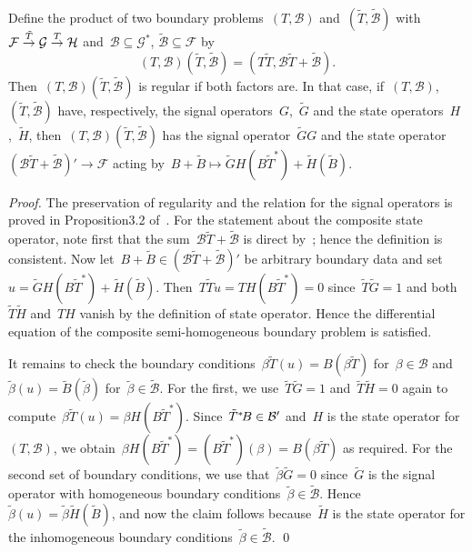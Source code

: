 \documentclass[a4paper]{llncs}
\newcommand{\galg}{\mathcal{F}}
\newcommand{\ogalg}{\mathcal{G}}
\newcommand{\oogalg}{\mathcal{H}}
\newcommand{\bspc}{\mathcal{B}}
\newenvironment{myproof}{\begin{proof}}{\qed\end{proof}}
\begin{document}
\begin{myproposition}
  \label{prop:bp-product}
  Define the product of two boundary problems~$(T, \bspc)$ and~$(\tilde{T},
  \tilde{\bspc})$ with~$\vphantom{\overset{e}{\to}}\smash{\galg
    \overset{\tilde{T}}{\to} \ogalg \overset{T}{\to} \oogalg}$ and~$\bspc
  \subseteq \ogalg^*$, $\tilde{\bspc} \subseteq \galg$ by
\begin{equation*}
    (T, \bspc) (\tilde{T}, \tilde{\bspc}) = (T \tilde{T}, \bspc \tilde{T} +
    \tilde{\bspc}).
  \end{equation*}
Then~$(T, \bspc) (\tilde{T}, \tilde{\bspc})$ is regular if both factors
  are. In that case, if~$(T, \bspc)$,~$(\tilde{T}, \tilde{\bspc})$ have,
  respectively, the signal operators~$G$,~$\tilde{G}$ and the state
  operators~$H$,~$\tilde{H}$, then~$(T, \bspc) (\tilde{T}, \tilde{\bspc})$ has
  the signal operator~$\tilde{G} G$ and the state operator~$(\bspc \tilde{T} +
  \tilde{\bspc})' \to \galg$ acting by~$B + \tilde{B} \mapsto \tilde{G}H(B
  \tilde{T}^*) + \tilde{H}(\tilde{B})$.
\end{myproposition}
\begin{myproof}
  The preservation of regularity and the relation for the signal operators is
  proved in Proposition3.2 of~\cite{RegensburgerRosenkranz2009}. For the statement
  about the composite state operator, note first that the sum~$\bspc \tilde{T} +
  \tilde{\bspc}$ is direct by~\cite[(3.2)]{RegensburgerRosenkranz2009}; hence
  the definition is consistent. Now let~$B + \tilde{B} \in (\bspc \tilde{T} +
  \tilde{\bspc})'$ be arbitrary boundary data and set~$u = \tilde{G}H(B
  \tilde{T}^*) + \tilde{H}(\tilde{B})$. Then~$T \tilde{T} u = TH(B \tilde{T}^*)
  = 0$ since~$\tilde{T}\tilde{G} = 1$ and both~$\tilde{T} \tilde{H}$ and~$TH$
  vanish by the definition of state operator. Hence the differential equation of
  the composite semi-homogeneous boundary problem is satisfied.

  It remains to check the boundary conditions~$\beta \tilde{T}(u) = B(\beta
  \tilde{T})$ for~$\beta \in \bspc$ and~$\tilde{\beta}(u) =
  \tilde{B}(\tilde{\beta})$ for~$\tilde{\beta} \in \tilde{\bspc}$. For the
  first, we use~$\tilde{T} \tilde{G} = 1$ and~$\tilde{T} \tilde{H} = 0$ again to
  compute~$\beta \tilde{T}(u) = \beta H (B \tilde{T}^*)$. Since~$\tilde{T}^*
  \kern-1.5pt B \in \bspc'$ and~$H$ is the state operator for~$(T, \bspc)$, we
  obtain~$\beta H(B \tilde{T}^*) = (B \tilde{T}^*) (\beta) = B(\beta \tilde{T})$
  as required. For the second set of boundary conditions, we use
  that~$\tilde{\beta} \tilde{G} = 0$ since~$\tilde{G}$ is the signal operator
  with homogeneous boundary conditions~$\tilde{\beta} \in
  \tilde{\bspc}$. Hence~$\tilde{\beta}(u) = \tilde{\beta} \tilde{H}(\tilde{B})$,
  and now the claim follows because~$\tilde{H}$ is the state operator for the
  inhomogeneous boundary conditions~$\tilde{\beta} \in \tilde{\bspc}$.
\end{myproof}
\end{document}
